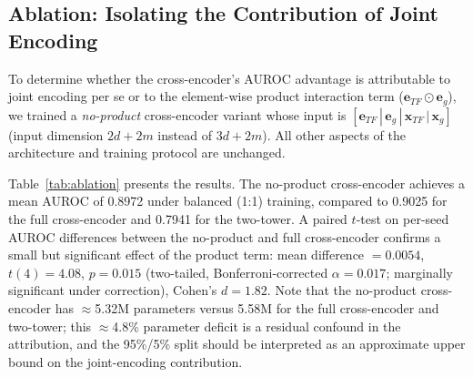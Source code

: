 \documentclass[journal]{IEEEtran}
\begin{document}
\begin{table}[!t]
  \caption{Performance Across Negative Sampling Ratios (Mean $\pm$ Std, 5 Seeds).
    AUROC shown as mean $\pm$ std across 5 seeds. F1 = macro F1.
    $^\dagger$50:1 two-tower: 4/5 seeds completed; all collapsed to chance.}
  \label{tab:imbalance}
  \centering
\end{table}

\subsection{Ablation: Isolating the Contribution of Joint Encoding}
\label{ssec:ablation}

To determine whether the cross-encoder's AUROC advantage is attributable to
joint encoding per se or to the element-wise product interaction term
($\mathbf{e}_{TF} \odot \mathbf{e}_g$), we trained a \emph{no-product}
cross-encoder variant whose input is
$[\mathbf{e}_{TF} \,|\, \mathbf{e}_g \,|\, \mathbf{x}_{TF} \,|\, \mathbf{x}_g]$
(input dimension $2d + 2m$ instead of $3d + 2m$). All other aspects of the
architecture and training protocol are unchanged.

Table~\ref{tab:ablation} presents the results. The no-product cross-encoder
achieves a mean AUROC of 0.8972 under balanced (1:1) training, compared to
0.9025 for the full cross-encoder and 0.7941 for the two-tower. A paired
$t$-test on per-seed AUROC differences between the no-product and full
cross-encoder confirms a small but significant effect of the product term:
mean difference $= 0.0054$, $t(4) = 4.08$, $p = 0.015$ (two-tailed,
Bonferroni-corrected $\alpha = 0.017$; marginally significant under
correction), Cohen's $d = 1.82$. Note that the no-product cross-encoder has
$\approx$5.32M parameters versus 5.58M for the full cross-encoder and
two-tower; this $\approx$4.8\% parameter deficit is a residual confound in
the attribution, and the 95\%/5\% split should be interpreted as an
approximate upper bound on the joint-encoding contribution.
\end{document}
